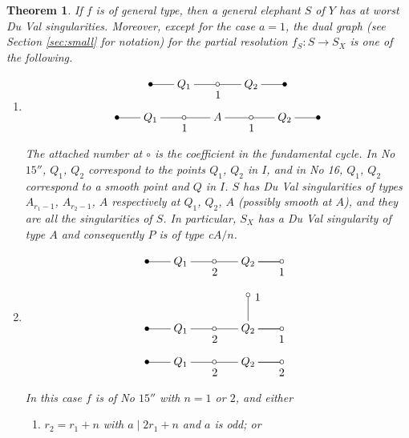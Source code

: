 \documentclass[a4paper,11pt]{amsart}
\newtheorem{theorem}{Theorem}[section]
\theoremstyle{definition}
\theoremstyle{remark}
\numberwithin{equation}{section}
\begin{document}
\begin{theorem}\label{thm:hard_GE}
If $f$ is of general type,
then a general elephant $S$ of $Y$ has at worst Du Val singularities.
Moreover,
except for the case $a=1$,
the dual graph
\textup{(}see Section \textup{\ref{sec:small}} for notation\textup{)}
for the partial resolution $f_S \colon S \to S_X$ is one of the following.
\begin{enumerate}
\item\label{itm:hard_A}
\begin{gather*}
\xymatrix@!0@=30pt{
*=<3.5pt>{\bullet} \ar@{-}[r] &
Q_1 \ar@{-}[r] &
*=<3.5pt>{\circ} \ar@{-}[r]_<*+{\>\!\!\!1} &
Q_2 \ar@{-}[r] &
*=<3.5pt>{\bullet}
}
\\
\xymatrix@!0@=30pt{
*=<3.5pt>{\bullet} \ar@{-}[r] &
Q_1 \ar@{-}[r] &
*=<3.5pt>{\circ} \ar@{-}[r]_<*+{\>\!\!\!1} &
A \ar@{-}[r] &
*=<3.5pt>{\circ} \ar@{-}[r]_<*+{\>\!\!\!1} &
Q_2 \ar@{-}[r] &
*=<3.5pt>{\bullet}
}
\end{gather*}
The attached number at $\circ$
is the coefficient in the fundamental cycle.
In No $\textrm{15}''$,
$Q_1$, $Q_2$ correspond to the points $Q_1$, $Q_2$ in $I$,
and in No 16,
$Q_1$, $Q_2$ correspond to a smooth point and $Q$ in $I$.
$S$ has Du Val singularities of types $A_{r_1-1}$, $A_{r_2-1}$, $A$
respectively at $Q_1$, $Q_2$, $A$
\textup{(}possibly smooth at $A$\textup{)},
and they are all the singularities of $S$.
In particular, $S_X$ has a Du Val singularity of type $A$
and consequently $P$ is of type c$A/n$.
\item\label{itm:hard_D}
\begin{gather*}
\xymatrix@!0@=30pt{
*=<3.5pt>{\bullet} \ar@{-}[r] &
Q_1 \ar@{-}[r] &
*=<3.5pt>{\circ} \ar@{-}[r]_<*+{\>\!\!\!2} &
Q_2 \ar@{-}[r] \ar@{-}[r]_>*+{\ 1} &
*=<3.5pt>{\circ}
}
\\
\xymatrix@!0@=30pt{
*=<3.5pt>{} &
&
&
*=<3.5pt>{\circ} \ar@{-}[d]^<*+{1} &
\\
*=<3.5pt>{\bullet} \ar@{-}[r] &
Q_1 \ar@{-}[r] &
*=<3.5pt>{\circ} \ar@{-}[r]_<*+{\>\!\!\!2} &
Q_2 \ar@{-}[r] \ar@{-}[r]_>*+{\ 1} &
*=<3.5pt>{\circ}
}
\\
\xymatrix@!0@=30pt{
*=<3.5pt>{\bullet} \ar@{-}[r] &
Q_1 \ar@{-}[r] &
*=<3.5pt>{\circ} \ar@{-}[r]_<*+{\>\!\!\!2} &
Q_2 \ar@{-}[r] \ar@{-}[r]_>*+{\ 2} &
*=<3.5pt>{\circ}
}
\end{gather*}
In this case $f$ is of No $\textrm{15}''$ with $n=1$ or $2$,
and either
\begin{enumerate}
\item
$r_2=r_1+n$ with $a \mid 2r_1+n$ and $a$ is odd\textup{;} or

\end{enumerate}
\end{enumerate}
\end{theorem}
\end{document}
